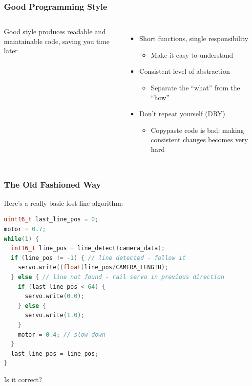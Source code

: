 \documentclass{beamer}
\begin{document}
\begin{frame}
\frametitle{Good Programming Style}
\begin{columns}[t]
Good style produces readable and maintainable code, saving you time later
\begin{itemize}
  \item Short functions, single responsibility
  \begin{itemize}
    \item Make it easy to understand
  \end{itemize}
  \item Consistent level of abstraction
  \begin{itemize}
    \item Separate the ``what'' from the ``how''
  \end{itemize}
  \item Don't repeat yourself (DRY)
  \begin{itemize}
    \item Copypaste code is bad: making consistent changes becomes very hard
  \end{itemize}
\end{itemize}

\end{columns}
\end{frame}


\begin{frame}[fragile]
\frametitle{The Old Fashioned Way}
Here's a really basic lost line algorithm:
\begin{lstlisting}[language=C++,basicstyle=\ttfamily\scriptsize]
uint16_t last_line_pos = 0;
motor = 0.7;
while(1) {
  int16_t line_pos = line_detect(camera_data);
  if (line_pos != -1) { // line detected - follow it
    servo.write((float)line_pos/CAMERA_LENGTH);
  } else { // line not found - rail servo in previous direction
    if (last_line_pos < 64) {
      servo.write(0.0);
    } else {
      servo.write(1.0);
    }
    motor = 0.4; // slow down
  }
  last_line_pos = line_pos;
}
\end{lstlisting}
Is it correct?
\end{frame}
\end{document}
